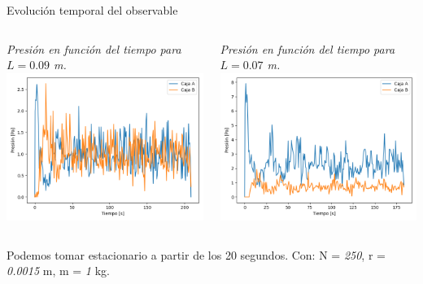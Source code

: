 \documentclass{beamer}
\begin{document}
\begin{frame}{Evolución temporal del observable}
  \begin{columns}
    \begin{column}{0.5\textwidth}
      \tiny \textit{Presión en función del tiempo para $L = \textit{0.09}$ m.}
      \includegraphics[width=\linewidth]{photoMaterial/pvt_09.png}
    \end{column}
    \begin{column}{0.5\textwidth}
      \tiny \textit{Presión en función del tiempo para $L = \textit{0.07}$ m.}
      \includegraphics[width=\linewidth]{photoMaterial/pvt_07.png}
    \end{column}
    \end{columns}
    \tiny Podemos tomar estacionario a partir de los 20 segundos.
    \tiny Con: N = \textit{250}, r = \textit{0.0015} m, m = \textit{1} kg.
\end{frame}
\end{document}
